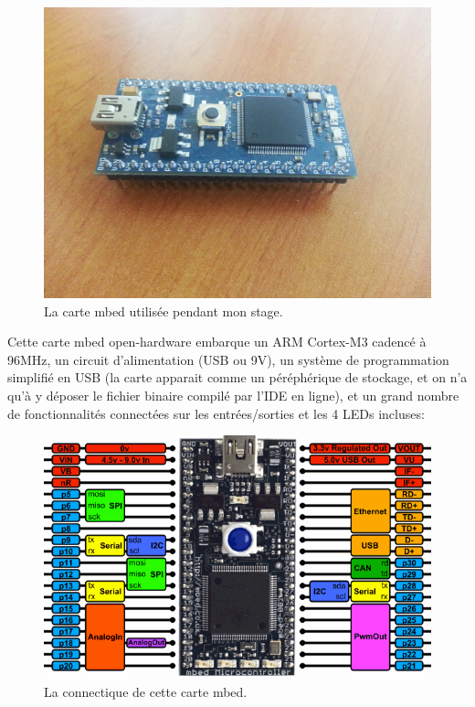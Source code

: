 \documentclass{article}
\begin{document}
\begin{figure}[h!]
    \centering\includegraphics[width=\linewidth*2/3]{img/mbed.jpg}
    \caption{La carte mbed utilisée pendant mon stage.}
\end{figure}

Cette carte mbed open-hardware embarque un ARM Cortex-M3 cadencé à 96MHz, un circuit d’alimentation (USB ou 9V), un système de programmation simplifié en USB (la carte apparait comme un péréphérique de stockage, et on n’a qu’à y déposer le fichier binaire compilé par l’IDE en ligne), et un grand nombre de fonctionnalités connectées sur les entrées/sorties et les 4 LEDs incluses:

\begin{figure}[h!]
    \centering\includegraphics[width=\linewidth*3/4]{img/pinout.png}
    \caption{La connectique de cette carte mbed.}
\end{figure}
\end{document}
